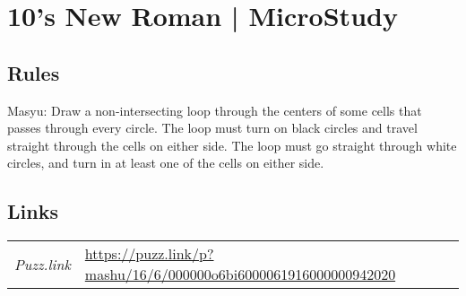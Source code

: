 \section{10's New Roman | {\normalfont MicroStudy}}
\label{sec:06-10-s-new-roman-microstudy}

\subsection*{Rules}
\begin{markdown}
Masyu: Draw a non-intersecting loop through the centers of some cells that passes through every circle. The loop must turn on black circles and travel straight through the cells on either side. The loop must go straight through white circles, and turn in at least one of the cells on either side.
\end{markdown}
\subsection*{Links}
\begin{tabularx}{\textwidth}{l X}
\emph{Puzz.link} & \url{https://puzz.link/p?mashu/16/6/000000o6bi6000061916000000942020} \\
\end{tabularx}
\pagebreak
